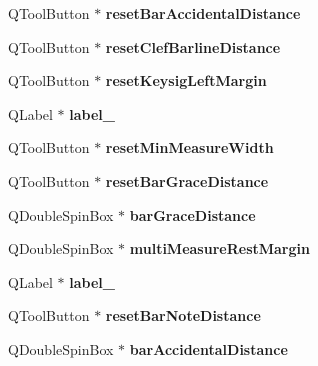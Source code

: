 \begin{DoxyCompactItemize}
Q\+Tool\+Button $\ast$ {\bfseries reset\+Bar\+Accidental\+Distance}
\item 
\mbox{\label{class_ui___edit_style_base_a018994f99055cc01a527a7dc8f8e7d62}} 
Q\+Tool\+Button $\ast$ {\bfseries reset\+Clef\+Barline\+Distance}
\item 
\mbox{\label{class_ui___edit_style_base_aa6e8cbb193fa65bc3db782bcc364624c}} 
Q\+Tool\+Button $\ast$ {\bfseries reset\+Keysig\+Left\+Margin}
\item 
\mbox{\label{class_ui___edit_style_base_abefa2848199123de84f2f1c11db2d30b}} 
Q\+Label $\ast$ {\bfseries label\+\_}
\item 
\mbox{\label{class_ui___edit_style_base_a901ca35812f9421b9880923387778a7d}} 
Q\+Tool\+Button $\ast$ {\bfseries reset\+Min\+Measure\+Width}
\item 
\mbox{\label{class_ui___edit_style_base_a55581ee4d40f422f6f300b8f9959acf8}} 
Q\+Tool\+Button $\ast$ {\bfseries reset\+Bar\+Grace\+Distance}
\item 
\mbox{\label{class_ui___edit_style_base_a3a6c1d285e5b2a98be3f137ef95479c1}} 
Q\+Double\+Spin\+Box $\ast$ {\bfseries bar\+Grace\+Distance}
\item 
\mbox{\label{class_ui___edit_style_base_aec439bdb88ad7e9f0a8232dadc9680b7}} 
Q\+Double\+Spin\+Box $\ast$ {\bfseries multi\+Measure\+Rest\+Margin}
\item 
\mbox{\label{class_ui___edit_style_base_a1606d335a979df0b47679be7dd94a5bd}} 
Q\+Label $\ast$ {\bfseries label\+\_}
\item 
\mbox{\label{class_ui___edit_style_base_a38dd033a65627cae30fb1b4d6515c836}} 
Q\+Tool\+Button $\ast$ {\bfseries reset\+Bar\+Note\+Distance}
\item 
\mbox{\label{class_ui___edit_style_base_adf399f0892c1ba96a2707d06f30f569d}} 
Q\+Double\+Spin\+Box $\ast$ {\bfseries bar\+Accidental\+Distance}

\end{DoxyCompactItemize}

